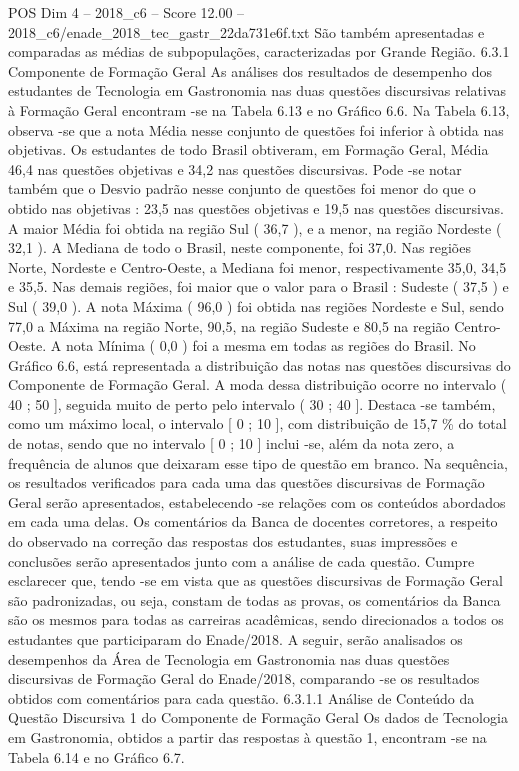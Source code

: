 \begin{textsample}{POS Dim 4 – 2018\_c6 – Score 12.00 – 2018\_c6/enade\_2018\_tec\_gastr\_22da731e6f.txt}
São também apresentadas e comparadas as médias de subpopulações, caracterizadas por Grande Região. 6.3.1 Componente de Formação Geral As análises dos resultados de desempenho dos estudantes de Tecnologia em Gastronomia nas duas questões discursivas relativas à Formação Geral encontram -se na Tabela 6.13 e no Gráfico 6.6.
Na Tabela 6.13, observa -se que a nota Média nesse conjunto de questões foi inferior à obtida nas objetivas.
Os estudantes de todo Brasil obtiveram, em Formação Geral, Média 46,4 nas questões objetivas e 34,2 nas questões discursivas.
Pode -se notar também que o Desvio padrão nesse conjunto de questões foi menor do que o obtido nas objetivas : 23,5 nas questões objetivas e 19,5 nas questões discursivas.
A maior Média foi obtida na região Sul ( 36,7 ), e a menor, na região Nordeste ( 32,1 ).
A Mediana de todo o Brasil, neste componente, foi 37,0.
Nas regiões Norte, Nordeste e Centro-Oeste, a Mediana foi menor, respectivamente 35,0, 34,5 e 35,5.
Nas demais regiões, foi maior que o valor para o Brasil : Sudeste ( 37,5 ) e Sul ( 39,0 ).
A nota Máxima ( 96,0 ) foi obtida nas regiões Nordeste e Sul, sendo 77,0 a Máxima na região Norte, 90,5, na região Sudeste e 80,5 na região Centro-Oeste.
A nota Mínima ( 0,0 ) foi a mesma em todas as regiões do Brasil.
No Gráfico 6.6, está representada a distribuição das notas nas questões discursivas do Componente de Formação Geral.
A moda dessa distribuição ocorre no intervalo ( 40 ; 50 ], seguida muito de perto pelo intervalo ( 30 ; 40 ].
Destaca -se também, como um máximo local, o intervalo [ 0 ; 10 ], com distribuição de 15,7 \% do total de notas, sendo que no intervalo [ 0 ; 10 ] inclui -se, além da nota zero, a frequência de alunos que deixaram esse tipo de questão em branco.
Na sequência, os resultados verificados para cada uma das questões discursivas de Formação Geral serão apresentados, estabelecendo -se relações com os conteúdos abordados em cada uma delas.
Os comentários da Banca de docentes corretores, a respeito do observado na correção das respostas dos estudantes, suas impressões e conclusões serão apresentados junto com a análise de cada questão.
Cumpre esclarecer que, tendo -se em vista que as questões discursivas de Formação Geral são padronizadas, ou seja, constam de todas as provas, os comentários da Banca são os mesmos para todas as carreiras acadêmicas, sendo direcionados a todos os estudantes que participaram do Enade/2018.
A seguir, serão analisados os desempenhos da Área de Tecnologia em Gastronomia nas duas questões discursivas de Formação Geral do Enade/2018, comparando -se os resultados obtidos com comentários para cada questão. 6.3.1.1 Análise de Conteúdo da Questão Discursiva 1 do Componente de Formação Geral Os dados de Tecnologia em Gastronomia, obtidos a partir das respostas à questão 1, encontram -se na Tabela 6.14 e no Gráfico 6.7.

\end{textsample}
